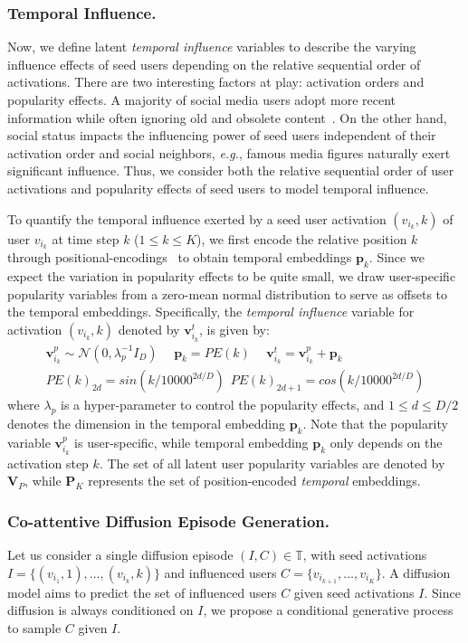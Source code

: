 \documentclass[sigconf]{acmart}
\def\rvp{{\mathbf{p}}}
\def\rvv{{\mathbf{v}}}
\def\mP{{\bm{P}}}
\def\mV{{\bm{V}}}
\def\gN{{\mathcal{N}}}
\def\sT{{\mathbb{T}}}
\begin{document}
\subsubsection{\textbf{Temporal Influence.}} Now, we define latent \textit{temporal influence} variables to describe the varying influence effects of seed users depending on the relative sequential order of activations.
There are two interesting factors at play: activation orders and popularity effects.
A majority of social media users adopt more recent information while often ignoring old and obsolete content~\cite{implicit_diffusion}.
On the other hand, social status impacts the influencing power of seed users independent of their activation order and social neighbors,
\textit{e.g.}, famous media figures naturally exert significant influence.
Thus, we consider both the relative sequential order of user activations and popularity effects of seed users to model temporal influence.

To quantify the temporal influence exerted by a seed user activation $(v_{i_k}, k)$ of user $v_{i_k}$ at time step $k$ ($ 1\leq k \leq K$), we first encode the relative position $k$ through positional-encodings~\cite{posn-enc} to obtain temporal embeddings $\rvp_k$.
Since we expect the variation in popularity effects to be quite small, we draw
user-specific popularity variables from a zero-mean normal distribution to serve as offsets to the temporal embeddings.
Specifically, the \emph{temporal influence} variable for activation $(v_{i_k}, k)$ denoted by $\rvv^{t}_{i_k}$, is given by:
\vspace{-3pt}
\begin{align}
    \rvv^{p}_{i_k} \sim \gN (0, \lambda_{p}^{-1} I_D) \hspace{15pt}  \rvp_k = PE(k) \hspace{15pt} \rvv^{t}_{i_k} =  \rvv^{p}_{i_k} + \rvp_k \\
    PE(k)_{2d} = sin(k/10000^{2d/D}) \hspace{5pt} PE(k)_{2d+1} = cos(k/10000^{2d/D}) \nonumber
\end{align}
where $\lambda_{p}$ is a hyper-parameter to control the popularity effects, and $1 \leq d \leq D/2$ denotes the dimension in the temporal embedding $\rvp_k$.
Note that the popularity variable $\rvv^{p}_{i_k}$ is user-specific, while temporal embedding $\rvp_k$ only depends on the activation step $k$.
The set of all latent user popularity variables are denoted by $\mV_{P}$, while $\mP_K$ represents the set of position-encoded \emph{temporal} embeddings.
\subsubsection{\textbf{Co-attentive Diffusion Episode Generation.}}
Let us consider a single diffusion episode $(I, C) \in \sT$, with seed activations $I = \{ (v_{i_1}, 1), \dots, (v_{i_k}, k)\}$ and influenced users $C = \{ v_{i_{k+1}}, \dots, v_{i_K}\}$.
A diffusion model aims to predict the set of influenced users $C$ given seed activations $I$.
Since diffusion is always conditioned on $I$, we propose a conditional generative process to sample $C$ given $I$. 
\end{document}
